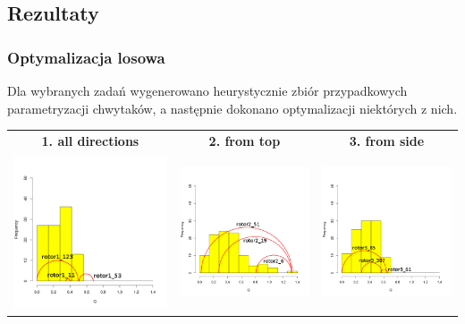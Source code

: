 \documentclass[12pt,a4paper,portrait]{beamer}
\begin{document}
\subsection{Rezultaty}
\begin{frame}
\frametitle{Optymalizacja losowa}
Dla wybranych zadań wygenerowano heurystycznie zbiór przypadkowych parametryzacji chwytaków, a następnie dokonano optymalizacji niektórych z nich.

\begin{center}
\begin{tabular}{|c|c|c|}
\hline
\textbf{1. all directions} & \textbf{2. from top} & \textbf{3. from side} \\
\includegraphics[width=0.3\linewidth]{images/s100_rotor1_opt} &
\includegraphics[width=0.3\linewidth]{images/s100_rotor2_opt} &
\includegraphics[width=0.3\linewidth]{images/s100_rotor3_opt} \\ \hline
\end{tabular}
\end{center}
\end{frame}
\end{document}
